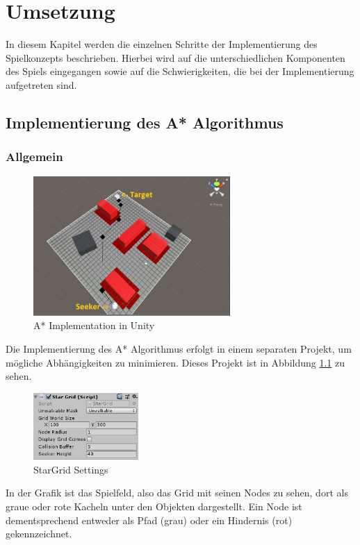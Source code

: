 \chapter{Umsetzung}
\label{sec:Umsetzung}
In diesem Kapitel werden die einzelnen Schritte der Implementierung des Spielkonzepts beschrieben. Hierbei wird auf die unterschiedlichen Komponenten des Spiels eingegangen sowie auf die Schwierigkeiten, die bei der Implementierung aufgetreten sind.

\section{Implementierung des A* Algorithmus}
\label{sec:implementAStar}
\subsection*{Allgemein}
\begin{figure}
    \includegraphics[width=7.5cm]{assets/aStarUnityImplementation.png}
    \caption{A* Implementation in Unity}
    \label{fig:aStarImplementationUnity}
\end{figure}
Die Implementierung des A* Algorithmus erfolgt in einem separaten Projekt, um mögliche Abhängigkeiten zu minimieren. Dieses Projekt ist in Abbildung \ref{fig:aStarImplementationUnity} zu sehen.
\begin{figure}
    \includegraphics[width=4cm]{assets/aStarGridSettings}
    \caption{StarGrid Settings}
    \label{fig:aStarGridSettings}
\end{figure}
In der Grafik ist das Spielfeld, also das Grid mit seinen Nodes zu sehen, dort als graue oder rote Kacheln unter den Objekten dargestellt. Ein Node ist dementsprechend entweder als Pfad (grau) oder ein Hindernis (rot) gekennzeichnet.

